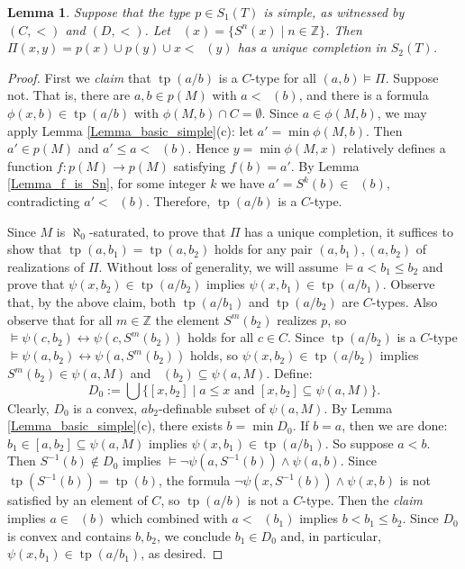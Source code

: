 \documentclass[12pt]{amsart}
\newtheorem{Lemma}[Theorem]{Lemma}
\theoremstyle{definition}
\DeclareMathOperator{\cl}{cl_S}
\DeclareMathOperator{\tp}{tp}
\begin{document}
\begin{Lemma}\label{Lemma_x<cl(y)}
Suppose that the type $p\in S_1(T)$ is simple, as witnessed by $(C,<)$  and $(D,<)$. Let $\cl(x)=\{S^n(x)\mid n\in\mathbb Z\}$. Then   $\Pi(x,y)=p(x)\cup p(y)\cup x<\cl(y)$ has a unique completion in $S_2(T)$. 
\end{Lemma}
\begin{proof}First we {\it claim} that $\tp(a/b)$ is a $C$-type for all $(a,b)\models \Pi$. Suppose not. That is, there are $a,b\in p(M)$ with  $a<\cl(b)$, and there is a formula   $\phi(x,b)\in \tp(a/b)$ with $\phi(M,b)\cap C=\emptyset$.  Since $a\in \phi(M,b)$, we may apply Lemma \ref{Lemma_basic_simple}(c): let $a'=\min \phi(M,b)$. Then $a'\in p(M)$ and  $a'\leq a<\cl(b)$. Hence $y=\min\phi(M,x)$ relatively defines a function  $f:p(M)\to p(M)$ satisfying $f(b)=a'$. By Lemma 
\ref{Lemma_f_is_Sn},  for some integer $k$ we have $a'=S^k(b)\in\cl(b)$, contradicting $a'<\cl(b)$. Therefore, $\tp(a/b)$ is a $C$-type. 

Since $M$ is $\aleph_0$-saturated, to prove that $\Pi$ has a unique completion, it suffices to show that $\tp(a,b_1)=\tp(a,b_2)$ holds for any pair $(a,b_1),(a,b_2)$  of realizations of $\Pi$.  Without loss of generality, we will  assume $\models a<b_1\leq b_2$ and  prove that $\psi(x,b_2)\in \tp(a/b_2)$ implies $\psi(x,b_1)\in\tp(a/b_1)$. Observe that, by the above claim, both $\tp(a/b_1)$ and $\tp(a/b_2)$ are $C$-types.
Also observe that for all $m\in\mathbb Z$ the element   $S^m(b_2)$ realizes $p$, so $\models \psi(c,b_2)\leftrightarrow \psi(c,S^m(b_2))$ holds for all $c\in C$. Since $\tp(a/b_2)$ is a $C$-type  $\models \psi(a,b_2)\leftrightarrow \psi(a,S^m(b_2))$ holds, so $\psi(x,b_2)\in\tp(a/b_2)$ implies $S^m(b_2)\in\psi(a,M)$ and $\cl(b_2)\subseteq \psi(a,M)$. 
Define: 
$$D_0:=\bigcup\{[x,b_2]\mid a\leq x \mbox{ and } [x,b_2]\subseteq \psi(a,M)\}.$$ 
Clearly, $D_0$ is a convex, $ab_2$-definable subset of $\psi(a,M)$. By Lemma \ref{Lemma_basic_simple}(c), there exists $b=\min D_0$. If  $b=a$,  then we are done: $b_1\in [a,b_2]\subseteq\psi(a,M)$ implies $\psi(x,b_1)\in\tp(a/b_1)$. So suppose $a<b$. 
Then $S^{-1}(b)\notin D_0$ implies  $\models  \lnot\psi(a,S^{-1}(b))\land \psi(a,b)$. Since $\tp(S^{-1}(b))=\tp(b)$, the formula $\lnot\psi(x,S^{-1}(b))\land \psi(x,b)$ is not satisfied by an element of $C$, so $\tp(a/b)$ is not a $C$-type. 
Then  the {\it claim} implies $a\in \cl(b)$ which combined with $a<\cl(b_1)$ implies $b<b_1\leq b_2$. Since $D_0$ is convex and contains $b,b_2$, we conclude $b_1\in D_0$ and, in particular, $\psi(x,b_1)\in \tp(a/b_1)$, as desired. 
\end{proof}
\end{document}
